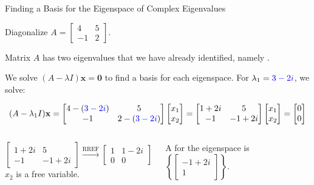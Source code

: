 \documentclass[xcolor=dvipsnames,aspectratio=169,t]{beamer}
\begin{document}
\begin{frame}{Finding a Basis for the Eigenspace of Complex Eigenvalues}
  \begin{example}
  Diagonalize $A = \begin{bmatrix} 4 & 5 \\ -1 & 2 \end{bmatrix}$.
  \end{example}
  \medskip

  Matrix $A$ has two eigenvalues that we have already identified, namely .
  
  We solve $(A - \lambda I)\mathbf{x} = \mathbf{0}$ to find a basis for each eigenspace.
  For $\lambda_1 = \textcolor{blue}{3-2i}$, we solve:

  \[ (A - \lambda_1 I)\mathbf{x}
  =\begin{bmatrix} 4-(\textcolor{blue}{3-2i}) & 5 \\ -1 & 2-(\textcolor{blue}{3-2i}) \end{bmatrix} \begin{bmatrix} x_1 \\ x_2 \end{bmatrix} 
  =\begin{bmatrix} 1+2i & 5 \\ -1 & -1+2i \end{bmatrix} \begin{bmatrix} x_1 \\ x_2 \end{bmatrix} 
  = \begin{bmatrix} 0 \\ 0 \end{bmatrix}
  \]
  \vspace*{-1em}
  
  \pause
  \begin{columns}[T]
  \[
    \begin{bmatrix} 1+2i & 5 \\ -1 & -1+2i \end{bmatrix}
    \xrightarrow{\text{RREF}}
    \begin{bmatrix} 1 & 1-2i \\ 0 & 0 \end{bmatrix}
  \]
  \hfill $x_2$ is a \alert{free variable}. \hspace*{2em}
  
  \bigskip
  
  \pause
  A  for the eigenspace is 
  $\left\{ \begin{bmatrix} -1+2i \\ 1 \end{bmatrix} \right\}$.
  \end{columns}

\end{frame}
\end{document}
